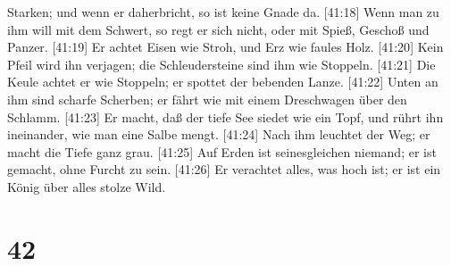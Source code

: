 Starken; und wenn er daherbricht, so ist keine Gnade da. 
{[}41:18{]} Wenn man zu ihm will mit dem Schwert, so regt er sich nicht,
oder mit Spieß, Geschoß und Panzer.  {[}41:19{]} Er achtet
Eisen wie Stroh, und Erz wie faules Holz.  {[}41:20{]} Kein
Pfeil wird ihn verjagen; die Schleudersteine sind ihm wie Stoppeln.
 {[}41:21{]} Die Keule achtet er wie Stoppeln; er spottet
der bebenden Lanze.  {[}41:22{]} Unten an ihm sind scharfe
Scherben; er fährt wie mit einem Dreschwagen über den Schlamm.
 {[}41:23{]} Er macht, daß der tiefe See siedet wie ein
Topf, und rührt ihn ineinander, wie man eine Salbe mengt. 
{[}41:24{]} Nach ihm leuchtet der Weg; er macht die Tiefe ganz grau.
 {[}41:25{]} Auf Erden ist seinesgleichen niemand; er ist
gemacht, ohne Furcht zu sein.  {[}41:26{]} Er verachtet
alles, was hoch ist; er ist ein König über alles stolze Wild.

\hypertarget{section-41}{%
\section{42}\label{section-41}}

